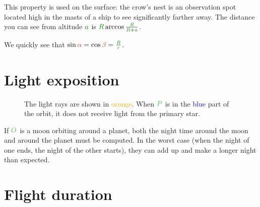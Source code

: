 \begin{remark}
This property is used on the surface: the crow's nest is an observation
spot located high in the masts of a ship to see significantly farther
away. The distance you can see from altitude $\dist{a}$ is $\dist{R}
\arccos \frac {\dist{R}} {\dist{R} + \dist{a}}$.
\end{remark}

We quickly see that $\sin \angle{\alpha} = \cos \angle{\beta} = \frac
{\dist{R}} {\dist{r}}$.

\section{Light exposition}

\begin{figure}[H]
	\centering
	\caption{
		The light rays are shown in \textcolor{orange}{orange}.
		When $\posit{P}$ is in the \textcolor{blue}{blue}
		part of the orbit, it does not receive light from the
		primary star.
	}
\end{figure}

\begin{important}
If $\posit{O}$ is a moon orbiting around a planet, both the night time
around the moon and around the planet must be computed. In the worst case
(when the night of one ends, the night of the other starts), they can
add up and make a longer night than expected.
\end{important}

\section{Flight duration}
